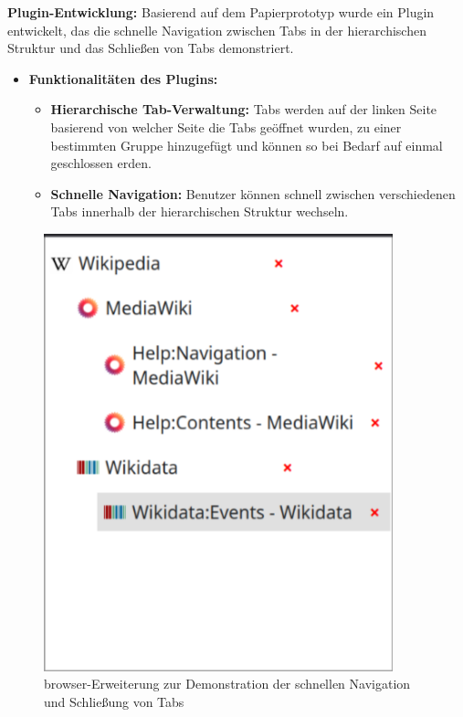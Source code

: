 \textbf{Plugin-Entwicklung:}
Basierend auf dem Papierprototyp wurde ein Plugin entwickelt, das die schnelle Navigation zwischen Tabs in der hierarchischen Struktur und das Schließen von Tabs demonstriert.

\begin{itemize}
    \item \textbf{Funktionalitäten des Plugins:}
    \begin{itemize}
        \item \textbf{Hierarchische Tab-Verwaltung:} Tabs werden auf der linken Seite basierend von welcher Seite die Tabs geöffnet wurden, zu einer bestimmten Gruppe hinzugefügt und können so bei Bedarf auf einmal geschlossen erden.
        \item \textbf{Schnelle Navigation:} Benutzer können schnell zwischen verschiedenen Tabs innerhalb der hierarchischen Struktur wechseln.
    \end{itemize}
\end{itemize}


\begin{figure}[H]
    \caption{\gls{browser}-Erweiterung zur Demonstration der schnellen Navigation und Schließung von Tabs}
    \includegraphics[width=0.9\textwidth]{abbildungen/hirachie.png}
    \end{figure}


